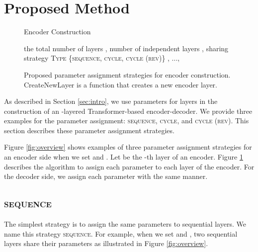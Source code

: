 \documentclass[11pt]{article}
\begin{document}
\section{Proposed Method}
\begin{figure}[!t]
  \begin{algorithm}[H]
\caption{Encoder Construction}
  \begin{algorithmic}[1]
   \renewcommand{\algorithmicrequire}{\textbf{Input:}}
   \renewcommand{\algorithmicensure}{\textbf{Output:}}
   \Require the total number of layers , number of independent layers , sharing strategy \textsc{Type}  \{\textsc{sequence, cycle, cycle (rev)}\}
   \Ensure , ..., 
     \If{ == }
     \State 
       \If{}
       \State 
       \Else
       \State 
       \EndIf
       \If{}
       \State 
       \Else
       \State 
       \EndIf
       \If{}
       \State 
       \ElsIf{}
       \State 
       \Else
       \State        
       \EndIf
     \EndIf
   \EndFor
\end{algorithmic}
  \end{algorithm}
  \caption{Proposed parameter assignment strategies for encoder construction. CreateNewLayer is a function that creates a new encoder layer.}
  \label{fig:enc_construction}
\end{figure}

As described in Section \ref{sec:intro}, we use parameters for  layers in the construction of an -layered Transformer-based encoder-decoder.
We provide three examples for the parameter assignment: \textsc{sequence}, \textsc{cycle}, and \textsc{cycle (rev)}.
This section describes these parameter assignment strategies.

Figure \ref{fig:overview} shows examples of three parameter assignment strategies for an encoder side when we set  and .
Let  be the -th layer of an encoder.
Figure \ref{fig:enc_construction} describes the algorithm to assign each parameter to each layer of the encoder.
For the decoder side, we assign each parameter with the same manner.


\subsection{\textsc{sequence}}
The simplest strategy is to assign the same parameters to sequential  layers.
We name this strategy \textsc{sequence}.
For example, when we set  and , two sequential layers share their parameters as illustrated in Figure \ref{fig:overview}.
\end{document}
